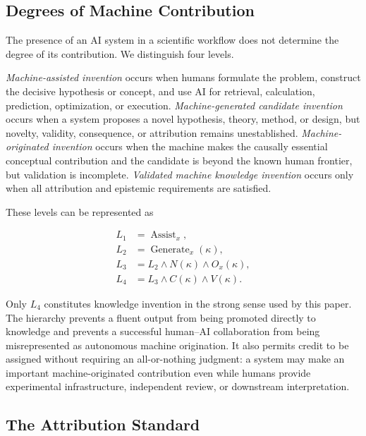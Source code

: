\subsection{\textbf{Degrees of Machine Contribution}}

The presence of an AI system in a scientific workflow does not determine the
degree of its contribution. We distinguish four levels.

\emph{Machine-assisted invention} occurs when humans formulate the problem,
construct the decisive hypothesis or concept, and use AI for retrieval,
calculation, prediction, optimization, or execution. \emph{Machine-generated
candidate invention} occurs when a system proposes a novel hypothesis, theory,
method, or design, but novelty, validity, consequence, or attribution remains
unestablished. \emph{Machine-originated invention} occurs when the machine
makes the causally essential conceptual contribution and the candidate is
beyond the known human frontier, but validation is incomplete.
\emph{Validated machine knowledge invention} occurs only when all attribution
and epistemic requirements are satisfied.

These levels can be represented as

\begin{equation}
\begin{aligned}
L_1&=\operatorname{Assist}_{x},\\
L_2&=\operatorname{Generate}_{x}(\kappa),\\
L_3&=L_2\land N(\kappa)\land O_x(\kappa),\\
L_4&=L_3\land C(\kappa)\land V(\kappa).
\end{aligned}
\label{eq:contribution_levels}
\end{equation}

Only $L_4$ constitutes knowledge invention in the strong sense used by this
paper. The hierarchy prevents a fluent output from being promoted directly to
knowledge and prevents a successful human--AI collaboration from being
misrepresented as autonomous machine origination. It also permits credit to be
assigned without requiring an all-or-nothing judgment: a system may make an
important machine-originated contribution even while humans provide
experimental infrastructure, independent review, or downstream interpretation.

\subsection{\textbf{The Attribution Standard}}

